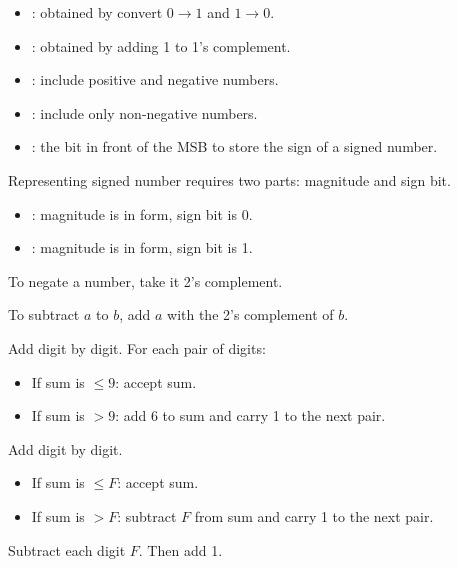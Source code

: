 \begin{multicols}{3}

    \begin{itemize}
      \item {}: obtained by convert $0 \to 1$ and $1 \to 0$.
      \item {}: obtained by adding 1 to 1's complement.
      \item {}: include positive and negative numbers.
      \item {}: include only non-negative numbers.
      \item {}: the bit in front of the MSB to store the sign
        of a signed number.
    \end{itemize}

    \par Representing signed number requires two parts: magnitude and sign bit.
    \begin{itemize}
      \item {}: magnitude is in  form, sign bit is 0.
      \item {}: magnitude is in  form, sign bit is 1.
    \end{itemize}

      \par To negate a number, take it 2's complement.
      \par To subtract $a$ to $b$, add $a$ with the 2's complement of $b$.
      \par Add digit by digit. For each pair of digits:
      \begin{itemize}
        \item If sum is $\leq 9$: accept sum.
        \item If sum is $> 9$: add 6 to sum and carry 1 to the next pair.
      \end{itemize}
      \par Add digit by digit.
      \begin{itemize}
        \item If sum is $\leq F$: accept sum.
        \item If sum is $> F$: subtract $F$ from sum and carry 1 to the next pair.
      \end{itemize}
      \par Subtract each digit  $F$. Then add 1.

\end{multicols}